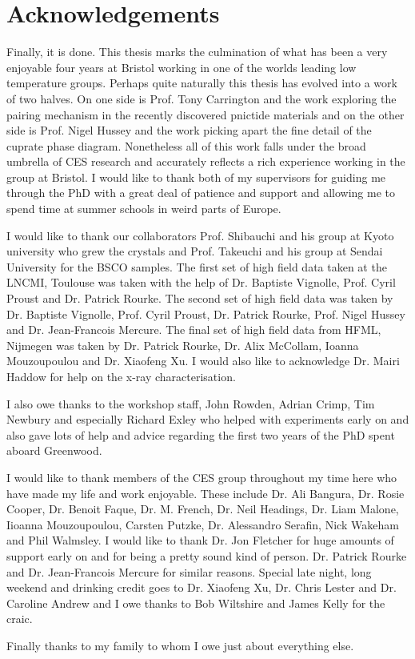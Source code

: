 \cleardoublepage

\section*{Acknowledgements}

Finally, it is done. This thesis marks the culmination of what has been a very enjoyable four years at Bristol working in one of the worlds leading low temperature groups. Perhaps quite naturally this thesis has evolved into a work of two halves. On one side is Prof. Tony Carrington and the work exploring the pairing mechanism in the recently discovered pnictide materials and on the other side is Prof. Nigel Hussey and the work picking apart the fine detail of the cuprate phase diagram. Nonetheless all of this work falls under the broad umbrella of CES research and accurately reflects a rich experience working in the group at Bristol. I would like to thank both of my supervisors for guiding me through the PhD with a great deal of patience and support and allowing me to spend time at summer schools in weird parts of Europe.

I would like to thank our collaborators Prof. Shibauchi and his group at Kyoto university who grew the \BaFePAs crystals and Prof. Takeuchi and his group at Sendai University for the \acs{BSCO} samples. The first set of high field data taken at the \ac{LNCMI}, Toulouse was taken with the help of Dr. Baptiste Vignolle, Prof. Cyril Proust and Dr. Patrick Rourke. The second set of high field data was taken by Dr. Baptiste Vignolle, Prof. Cyril Proust, Dr. Patrick Rourke, Prof. Nigel Hussey and Dr. Jean-Francois Mercure. The final set of high field data from \ac{HFML}, Nijmegen was taken by Dr. Patrick Rourke, Dr. Alix McCollam, Ioanna Mouzoupoulou and Dr. Xiaofeng Xu. I would also like to acknowledge Dr. Mairi Haddow for help on the x-ray characterisation.

I also owe thanks to the workshop staff, John Rowden, Adrian Crimp, Tim Newbury and especially Richard Exley who helped with experiments early on and also gave lots of help and advice regarding the first two years of the PhD spent aboard Greenwood.

I would like to thank members of the CES group throughout my time here who have made my life and work enjoyable. These include Dr. Ali Bangura, Dr. Rosie Cooper, Dr. Benoit Faque, Dr. M. French, Dr. Neil Headings, Dr. Liam Malone, Iioanna Mouzoupoulou, Carsten Putzke, Dr. Alessandro Serafin, Nick Wakeham and Phil Walmsley. I would like to thank Dr. Jon Fletcher for huge amounts of support early on and for being a pretty sound kind of person. Dr. Patrick Rourke and Dr. Jean-Francois Mercure for similar reasons. Special late night, long weekend and drinking credit goes to Dr. Xiaofeng Xu, Dr. Chris Lester and Dr. Caroline Andrew and I owe thanks to Bob Wiltshire and James Kelly for the craic.

Finally thanks to my family to whom I owe just about everything else.





